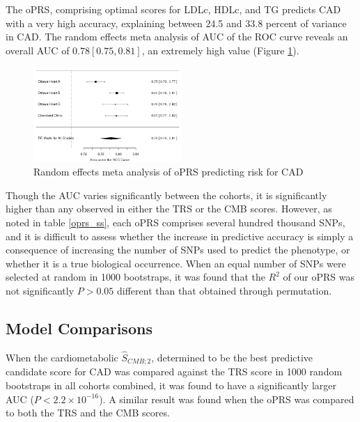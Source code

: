 The \ac{oPRS}, comprising optimal scores for \ac{LDLc}, \ac{HDLc}, and \ac{TG} predicts \ac{CAD} with a very high accuracy, explaining between 24.5 and 33.8 percent of variance in \ac{CAD}. The random effects meta analysis of \ac{AUC} of the \ac{ROC} curve reveals an overall \ac{AUC} of $0.78 [0.75, 0.81]$, an extremely high value (Figure \ref{oprs_meta}). 

\begin{figure}[H]
\label{oprs_meta}
\caption{Random effects meta analysis of \ac{oPRS} predicting risk for \ac{CAD}}
\centering
\includegraphics[width=0.5\textwidth]{Figures/oprs_meta.png}
\end{figure}


Though the \ac{AUC} varies significantly between the cohorts, it is significantly higher than any observed in either the \ac{TRS} or the \ac{CMB} scores. However, as noted in table \ref{oprs_ss}, each \ac{oPRS} comprises several hundred thousand \acp{SNP}, and it is difficult to assess whether the increase in predictive accuracy is simply a consequence of increasing the number of \acp{SNP} used to predict the phenotype, or whether it is a true biological occurrence. When an equal number of \acp{SNP} were selected at random in 1000 bootstraps, it was found that the $R^2$ of our \ac{oPRS} was not significantly $P > 0.05$ different than that obtained through permutation.


\subsection{Model Comparisons}

When the cardiometabolic $\hat{S}_{CMB; 2}$, determined to be the best predictive candidate score for \ac{CAD} was compared against the \ac{TRS} score in 1000 random bootstraps in all cohorts combined, it was found to have a significantly larger \ac{AUC} ($P < 2.2 \times 10^{-16}$). A similar result was found when the \ac{oPRS} was compared to both the \ac{TRS} and the \ac{CMB} scores.
